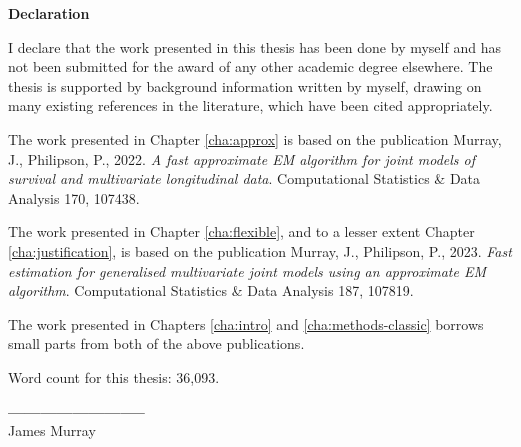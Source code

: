 \begin{center}
{\Huge \bf Declaration}
\end{center}
\noindent

    I declare that the work presented in this thesis has been done by myself and has not been submitted for the award of any other academic degree elsewhere. The thesis is supported by background information written by myself, drawing on many existing references in the literature, which have been cited appropriately.

    The work presented in Chapter \ref{cha:approx} is based on the publication Murray, J., Philipson, P., 2022. \textit{A fast approximate EM algorithm for joint models of survival and multivariate longitudinal data}. Computational Statistics \& Data Analysis 170, 107438.

    The work presented in Chapter \ref{cha:flexible}, and to a lesser extent Chapter \ref{cha:justification}, is based on the publication Murray, J., Philipson, P., 2023. \textit{Fast estimation for generalised multivariate joint models using an approximate EM algorithm}. Computational Statistics \& Data Analysis 187, 107819.

    The work presented in Chapters \ref{cha:intro} and \ref{cha:methods-classic} borrows small parts from both of the above publications.

    Word count for this thesis: 36,093.

    \vspace{5mm}
    \begin{flushright}
        \textbf{--------------------------}\\\vspace*{-2mm}\Large James Murray
    \end{flushright}

    
\thispagestyle{empty}
\restoregeometry